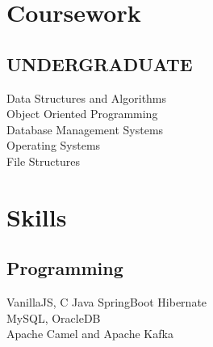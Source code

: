 \documentclass[]{deedy-resume-openfont}
\begin{document}
\begin{minipage}[t]{0.33\textwidth}

\section{Coursework}
\subsection{UNDERGRADUATE}
Data Structures and Algorithms\\
Object Oriented Programming\\
Database Management Systems\\
Operating Systems\\
File Structures\\
\sectionsep


\section{Skills}
\subsection{Programming}
VanillaJS, \textbullet{} C \textbullet{} Java \textbullet{} SpringBoot \textbullet{} 
Hibernate \\
\textbullet{} MySQL, OracleDB\\ 
\textbullet{} Apache Camel and Apache Kafka
\sectionsep

%
%

\end{minipage} 
\hfill
\end{document}
